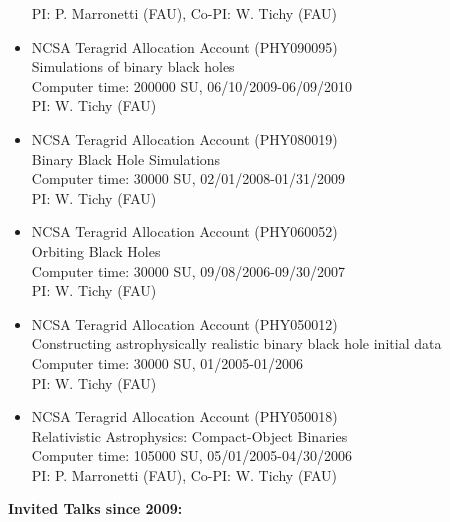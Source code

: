 \documentclass[11pt]{article}
\begin{document}
\begin{itemize}
	PI: P. Marronetti (FAU), Co-PI: W. Tichy (FAU)
\item	NCSA Teragrid Allocation Account (PHY090095)\\
	Simulations of binary black holes\\
	Computer time: 200000 SU, 06/10/2009-06/09/2010\\
	PI: W. Tichy (FAU)
\item	NCSA Teragrid Allocation Account (PHY080019)\\
	Binary Black Hole Simulations\\
	Computer time: 30000 SU, 02/01/2008-01/31/2009\\
	PI: W. Tichy (FAU)
\item	NCSA Teragrid Allocation Account (PHY060052)\\
	Orbiting Black Holes\\
	Computer time: 30000 SU, 09/08/2006-09/30/2007\\
	PI: W. Tichy (FAU)
\item	NCSA Teragrid Allocation Account (PHY050012)\\
	Constructing astrophysically realistic binary black hole initial data\\
	Computer time: 30000 SU, 01/2005-01/2006\\
	PI: W. Tichy (FAU)
\item	NCSA Teragrid Allocation Account (PHY050018)\\
	Relativistic Astrophysics: Compact-Object Binaries\\
	Computer time: 105000 SU, 05/01/2005-04/30/2006\\
	PI: P. Marronetti (FAU), Co-PI: W. Tichy (FAU)
\end{itemize}




\bigskip

{\bf Invited Talks since 2009:}
\end{document}
